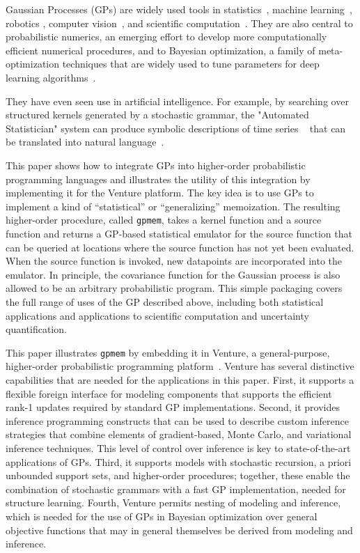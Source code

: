 Gaussian Processes (\acs{GP}s) are widely used tools in statistics~\citep{barry1986nonparametric}, machine learning~\citep{neal1995bayesian,williams1998bayesian,kuss2005assessing,rasmussen2006gaussian,damianou2013deep}, robotics \citep{ferris2006gaussian}, computer vision~\citep{kemmler2013one}, and scientific computation~\citep{kennedy2001bayesian,schneider2008simulations,kwan2013cosmic}.
They are also central to probabilistic numerics, an emerging effort to develop more computationally efficient numerical procedures, and to Bayesian optimization, a family of meta-optimization techniques that are widely used to tune parameters for deep learning algorithms~\citep{snoek2012practical,gelbart2014bayesian}. 

They have even seen use in artificial intelligence. For example, by searching
over structured kernels generated by a stochastic grammar, the "Automated
Statistician" system can produce symbolic descriptions of time series
~\citep{duvenaud2013structure} that can be translated into natural
language~\citep{lloyd2014automatic}.



This paper shows how to integrate \ac{GP}s into higher-order
probabilistic programming languages and illustrates the utility of this
integration by implementing it for the Venture platform. The key idea is to use
GPs to implement a kind of “statistical” or “generalizing” memoization. The
resulting higher-order procedure, called {\tt gpmem}, takes a kernel function
and a source function and returns a GP-based statistical emulator for the source
function that can be queried at locations where the source function has not yet
been evaluated. When the source function is invoked, new datapoints are
incorporated into the emulator. In principle, the covariance function for the
Gaussian process is also allowed to be an arbitrary probabilistic program. This simple packaging covers the full range of uses of the GP described above, including both statistical applications and applications to scientific computation and uncertainty quantification.

This paper illustrates {\tt gpmem} by embedding it in Venture, a general-purpose, higher-order probabilistic programming platform~\citep{mansinghka2014venture}. Venture has several distinctive capabilities that are needed for the applications in this paper. First, it supports a flexible foreign interface for modeling components that supports the efficient rank-1 updates required by standard GP implementations. Second, it provides inference programming constructs that can be used to describe custom inference strategies that combine elements of gradient-based, Monte Carlo, and variational inference techniques. This level of control over inference is key to state-of-the-art applications of GPs. Third, it supports models with stochastic recursion, a priori unbounded support sets, and higher-order procedures; together, these enable the combination of stochastic grammars with a fast GP implementation, needed for structure learning. Fourth, Venture permits nesting of modeling and inference, which is needed for the use of GPs in Bayesian optimization over general objective functions that may in general themselves be derived from modeling and inference.

